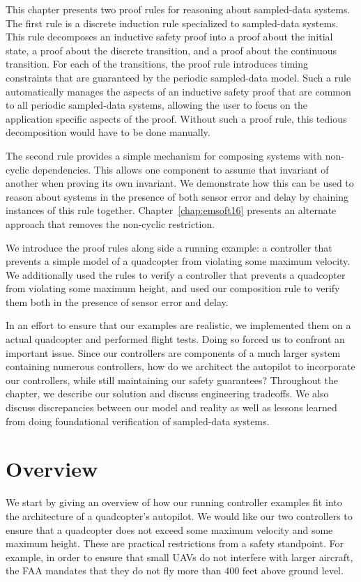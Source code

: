 This chapter presents two proof rules for reasoning about sampled-data
systems. The first rule is a discrete induction rule specialized to
sampled-data systems. This rule decomposes an inductive safety proof into a
proof about the initial state, a proof about the discrete transition, and a
proof about the continuous transition. For each of the transitions, the
proof rule introduces timing constraints that are guaranteed by the
periodic sampled-data model. Such a rule automatically manages the aspects
of an inductive safety proof that are common to all periodic sampled-data
systems, allowing the user to focus on the application specific aspects of
the proof. Without such a proof rule, this tedious decomposition would have
to be done manually.

The second rule provides a simple mechanism for composing systems with
non-cyclic dependencies. This allows one component to assume that invariant
of another when proving its own invariant. We demonstrate how this can be
used to reason about systems in the presence of both sensor error and delay
by chaining instances of this rule together. Chapter~\ref{chap:emsoft16}
presents an alternate approach that removes the non-cyclic restriction.

We introduce the proof rules along side a running example: a controller
that prevents a simple model of a quadcopter from violating some maximum
velocity. We additionally used the rules to verify a controller that
prevents a quadcopter from violating some maximum height, and used our
composition rule to verify them both in the presence of sensor error and
delay.

In an effort to ensure that our examples are realistic, we implemented them
on a actual quadcopter and performed flight tests. Doing so forced us to
confront an important issue. Since our controllers are components of a much
larger system containing numerous controllers, how do we architect the
autopilot to incorporate our controllers, while still maintaining our
safety guarantees? Throughout the chapter, we describe our solution and
discuss engineering tradeoffs. We also discuss discrepancies between our
model and reality as well as lessons learned from doing foundational
verification of sampled-data systems.

\section{Overview}
We start by giving an overview of how our running controller examples fit
into the architecture of a quadcopter's autopilot. We would like our two
controllers to ensure that a quadcopter does not exceed some maximum
velocity and some maximum height. These are practical restrictions from a
safety standpoint. For example, in order to ensure that small UAVs do not
interfere with larger aircraft, the FAA mandates that they do not fly more
than 400 feet above ground level.

